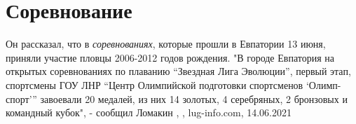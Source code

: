  
 
 
 
 
\chapter{Соревнование}

Он рассказал, что в \emph{соревнованиях}, которые прошли в Евпатории 13 июня,
приняли участие пловцы 2006-2012 годов рождения.  "В городе Евпатория на
открытых соревнованиях по плаванию \enquote{Звездная Лига Эволюции}, первый
этап, спортсмены ГОУ ЛНР \enquote{Центр Олимпийской подготовки
спортсменов \enquote{Олимп-спорт}} завоевали 20 медалей, из них 14 золотых, 4
серебряных, 2 бронзовых и командный кубок", - сообщил Ломакин
, 
, lug-info.com, 14.06.2021
